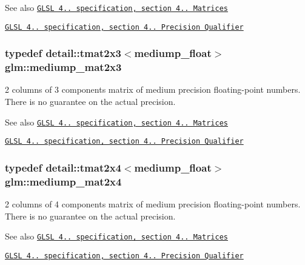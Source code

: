 \begin{DoxySeeAlso}{See also}
\href{http://www.opengl.org/registry/doc/GLSLangSpec.4.20.8.pdf}{\tt G\+L\+S\+L 4.. specification, section 4.. Matrices} 

\href{http://www.opengl.org/registry/doc/GLSLangSpec.4.20.8.pdf}{\tt G\+L\+S\+L 4.. specification, section 4.. Precision Qualifier} 
\end{DoxySeeAlso}
\hypertarget{group__core__precision_gac44c7deb23abed76330948e10d919bcc}{}
\subsubsection[{mediump\+\_\+mat2x3}]{\setlength{\rightskip}{0pt plus 5cm}typedef detail\+::tmat2x3$<$mediump\+\_\+float$>$ {\bf glm\+::mediump\+\_\+mat2x3}}\label{group__core__precision_gac44c7deb23abed76330948e10d919bcc}
2 columns of 3 components matrix of medium precision floating-\/point numbers. There is no guarantee on the actual precision.

\begin{DoxySeeAlso}{See also}
\href{http://www.opengl.org/registry/doc/GLSLangSpec.4.20.8.pdf}{\tt G\+L\+S\+L 4.. specification, section 4.. Matrices} 

\href{http://www.opengl.org/registry/doc/GLSLangSpec.4.20.8.pdf}{\tt G\+L\+S\+L 4.. specification, section 4.. Precision Qualifier} 
\end{DoxySeeAlso}
\hypertarget{group__core__precision_ga2e80caa3f70e504bd574664b1029e627}{}
\subsubsection[{mediump\+\_\+mat2x4}]{\setlength{\rightskip}{0pt plus 5cm}typedef detail\+::tmat2x4$<$mediump\+\_\+float$>$ {\bf glm\+::mediump\+\_\+mat2x4}}\label{group__core__precision_ga2e80caa3f70e504bd574664b1029e627}
2 columns of 4 components matrix of medium precision floating-\/point numbers. There is no guarantee on the actual precision.

\begin{DoxySeeAlso}{See also}
\href{http://www.opengl.org/registry/doc/GLSLangSpec.4.20.8.pdf}{\tt G\+L\+S\+L 4.. specification, section 4.. Matrices} 

\href{http://www.opengl.org/registry/doc/GLSLangSpec.4.20.8.pdf}{\tt G\+L\+S\+L 4.. specification, section 4.. Precision Qualifier} 
\end{DoxySeeAlso}
\hypertarget{group__core__precision_gab9f55249d1c065a72d525f3ffd3524be}{}
